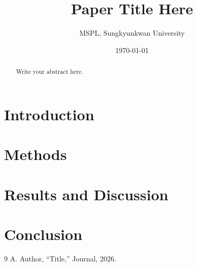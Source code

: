 \documentclass[10pt,a4paper,twocolumn]{article}
\title{Paper Title Here}
\author{MSPL, Sungkyunkwan University}
\date{\today}
\begin{document}
\maketitle

\begin{abstract}
Write your abstract here.
\end{abstract}

\section{Introduction}

\section{Methods}

\section{Results and Discussion}

\section{Conclusion}

\begin{thebibliography}{9}
 A. Author, ``Title,'' Journal, 2026.
\end{thebibliography}
\end{document}
